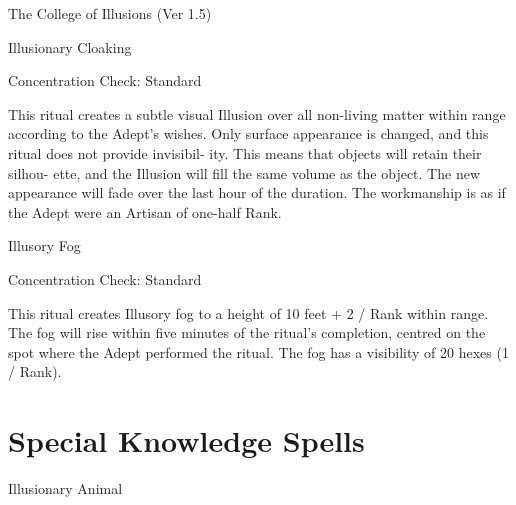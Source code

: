 \begin{Chapter}{The College of Illusions (Ver 1.5)}
\begin{ritual}[Q-1]{Illusionary Cloaking }

Concentration Check: Standard 
\begin{effects}
 This  ritual  creates  a  subtle  visual  Illusion 
over  all  non-living  matter  within  range  according 
to  the  Adept’s  wishes.  Only  surface  appearance  is 
changed, and this ritual does not provide invisibil-
ity. This means that objects will retain their silhou-
ette,  and  the  Illusion  will  fill  the  same  volume  as 
the  object.  The  new  appearance  will  fade  over  the 
last hour of the duration. The workmanship is as if 
the Adept were an Artisan of one-half Rank. 

\end{effects}
\end{ritual}

\begin{ritual}[Q-2]{Illusory Fog }

Concentration Check: Standard 
\begin{effects}
 This  ritual  creates  Illusory  fog  to  a  height 
of  10  feet  +  2  /  Rank  within  range.  The  fog  will 
rise within five minutes of the ritual’s completion, 
centred on the spot where the Adept performed the 
ritual.  The  fog  has  a  visibility  of  20  hexes  (1  / 
Rank). 


\end{effects}
\end{ritual}

\section{Special Knowledge Spells}

\begin{spell}[S-1]{Illusionary Animal }



\end{spell}
\end{Chapter}
